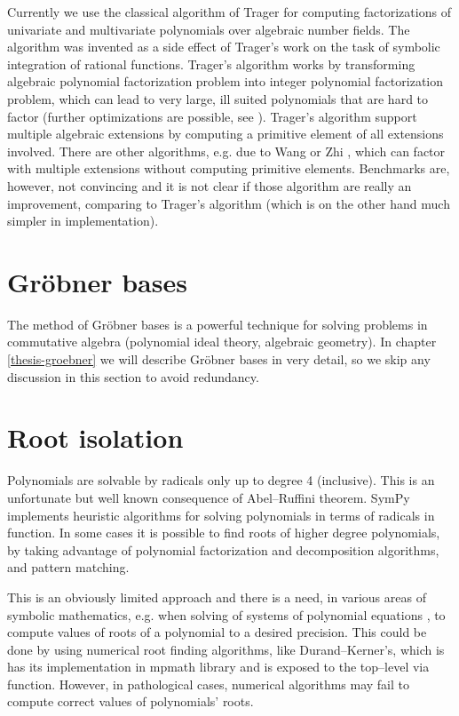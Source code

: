 Currently we use the classical algorithm of Trager \cite{Trager1976algebraic} for computing factorizations
of univariate and multivariate polynomials over algebraic number fields. The algorithm was invented as
a side effect of Trager's work on the task of symbolic integration of rational functions. Trager's
algorithm works by transforming algebraic polynomial factorization problem into integer polynomial
factorization problem, which can lead to very large, ill suited polynomials that are hard to factor
(further optimizations are possible, see \cite{Encarnacion1997norms}). Trager's algorithm support multiple
algebraic extensions by computing a primitive element of all extensions involved. There are other
algorithms, e.g. due to Wang \cite{Wang1976algebraic} or Zhi \cite{Zhi1997optimal}, which can factor with
multiple extensions without computing primitive elements. Benchmarks are, however, not convincing
and it is not clear if those algorithm are really an improvement, comparing to Trager's algorithm
(which is on the other hand much simpler in implementation).


\section{Gröbner bases}

The method of Gröbner bases is a powerful technique for solving problems in commutative
algebra (polynomial ideal theory, algebraic geometry). In chapter \ref{thesis-groebner}
we will describe Gröbner bases in very detail, so we skip any discussion in this section
to avoid redundancy.


\section{Root isolation}

Polynomials are solvable by radicals only up to degree 4 (inclusive). This is an unfortunate
but well known consequence of Abel--Ruffini theorem. SymPy implements heuristic algorithms
for solving polynomials in terms of radicals in  function. In some cases it is
possible to find roots of higher degree polynomials, by taking advantage of polynomial
factorization and decomposition algorithms, and pattern matching.

This is an obviously limited approach and there is a need, in various areas of symbolic
mathematics, e.g. when solving of systems of polynomial equations \cite{Strzebonski1997computing},
to compute values of roots of a polynomial to a desired precision. This could be done by using
numerical root finding algorithms, like Durand--Kerner's, which is has its implementation
in mpmath library and is exposed to the top--level via  function. However, in
pathological cases, numerical algorithms may fail to compute correct values of polynomials'
roots.

